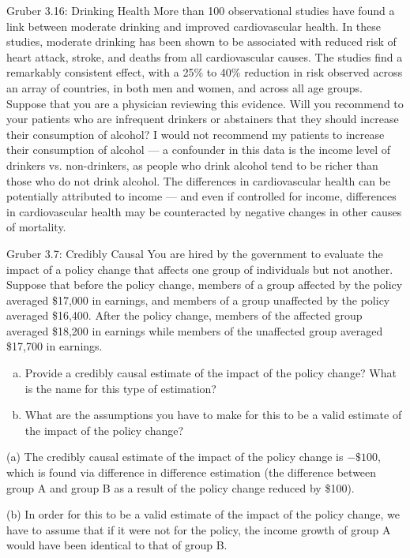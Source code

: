 \documentclass[10pt]{extarticle}
\begin{document}
  \begin{problem}{Gruber 3.16: Drinking Health}
    More than 100 observational studies have found a link between moderate drinking and improved cardiovascular health. In these studies, moderate drinking has been shown to be associated with reduced risk of heart attack, stroke, and deaths from all cardiovascular causes. The studies find a remarkably consistent effect, with a 25\% to 40\% reduction in risk observed across an array of countries, in both men and women, and across all age groups. Suppose that you are a physician reviewing this evidence. Will you recommend to your patients who are infrequent drinkers or abstainers that they should increase their consumption of alcohol?
    \tcblower
    I would not recommend my patients to increase their consumption of alcohol --- a confounder in this data is the income level of drinkers vs. non-drinkers, as people who drink alcohol tend to be richer than those who do not drink alcohol. The differences in cardiovascular health can be potentially attributed to income --- and even if controlled for income, differences in cardiovascular health may be counteracted by negative changes in other causes of mortality.
  \end{problem}
  \begin{problem}{Gruber 3.7: Credibly Causal}
    You are hired by the government to evaluate the impact of a policy change that affects one group of individuals but not another. Suppose that before the policy change, members of a group affected by the policy averaged \$17,000 in earnings, and members of a group unaffected by the policy averaged \$16,400. After the policy change, members of the affected group averaged \$18,200 in earnings while members of the unaffected group averaged \$17,700 in earnings.
    \begin{enumerate}[(a)]
      \item Provide a credibly causal estimate of the impact of the policy change? What is the name for this type of estimation?
      \item What are the assumptions you have to make for this to be a valid estimate of the impact of the policy change?
    \end{enumerate}
    \tcblower
    \begin{problem}{(a)}
      The credibly causal estimate of the impact of the policy change is $-\$100$, which is found via difference in difference estimation (the difference between group A and group B as a result of the policy change reduced by \$100).
    \end{problem}
    \begin{problem}{(b)}
      In order for this to be a valid estimate of the impact of the policy change, we have to assume that if it were not for the policy, the income growth of group A would have been identical to that of group B.
    \end{problem}
  \end{problem}
\end{document}
